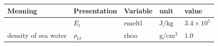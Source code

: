 \setlength\LTleft{0pt}\setlength\LTright{0pt}\begin{longtable}[]{@{}lllll@{}}
\toprule\relax
\begin{minipage}[b]{0.31\columnwidth}\raggedright
Meaning\strut
\end{minipage} & \begin{minipage}[b]{0.19\columnwidth}\raggedright
Presentation\strut
\end{minipage} & \begin{minipage}[b]{0.08\columnwidth}\raggedright
Variable\strut
\end{minipage} & \begin{minipage}[b]{0.12\columnwidth}\raggedright
unit\strut
\end{minipage} & \begin{minipage}[b]{0.17\columnwidth}\raggedright
value\strut
\end{minipage}\tabularnewline
\midrule\relax
\endhead
\begin{minipage}[t]{0.31\columnwidth}\raggedright
\strut
\end{minipage} & \begin{minipage}[t]{0.19\columnwidth}\raggedright
\(E_l\)\strut
\end{minipage} & \begin{minipage}[t]{0.08\columnwidth}\raggedright
emeltl\strut
\end{minipage} & \begin{minipage}[t]{0.12\columnwidth}\raggedright
\(\mathrm{J/kg}\)\strut
\end{minipage} & \begin{minipage}[t]{0.17\columnwidth}\raggedright
\(\mathrm{3.4\times 10^5}\)\strut
\end{minipage}\tabularnewline
\begin{minipage}[t]{0.31\columnwidth}\raggedright
density of sea water\strut
\end{minipage} & \begin{minipage}[t]{0.19\columnwidth}\raggedright
\(\rho_O\)\strut
\end{minipage} & \begin{minipage}[t]{0.08\columnwidth}\raggedright
rhoo\strut
\end{minipage} & \begin{minipage}[t]{0.12\columnwidth}\raggedright
\(\mathrm{g/cm^3}\)\strut
\end{minipage} & \begin{minipage}[t]{0.17\columnwidth}\raggedright
\(1.0\)\strut
\end{minipage}\tabularnewline

\end{longtable}
